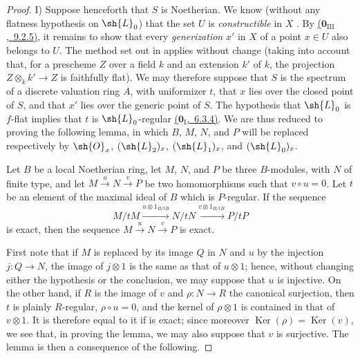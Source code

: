 \begin{proof}
\medskip
I) Suppose henceforth that $S$ is Noetherian.
We know (without any flatness hypothesis on $\sh{L}_0$) that the set $U$ is \emph{constructible} in $X$ .
By \hyperref[0.9.2.5]{($\mathbf{0}_{\mathrm{III}}$,~9.2.5)}, it remains to show that every \emph{generization} $x'$ in $X$ of a point $x\in U$ also belongs to $U$.
The method set out in  applies without change (taking into account that, for a prescheme $Z$ over a field $k$ and an extension $k'$ of $k$, the projection $Z\otimes_k k'\to Z$ is faithfully flat).
We may therefore suppose that $S$ is the spectrum of a discrete valuation ring $A$, with uniformizer $t$, that $x$ lies over the closed point of $S$, and that $x'$ lies over the generic point of $S$.
The hypothesis that $\sh{L}_0$ is $f$-flat implies that $t$ is $\sh{L}_0$-regular \hyperref[0.6.3.4]{($\mathbf{0}_{\mathrm{I}}$,~6.3.4)}.
We are thus reduced to proving the following lemma, in which $B$, $M$, $N$, and $P$ will be replaced respectively by $\sh{O}_x$, $(\sh{L}_2)_x$, $(\sh{L}_1)_x$, and $(\sh{L}_0)_x$.

\begin{lemma}[12.3.3.1]
\label{IV.12.3.3.1}
Let $B$ be a local Noetherian ring, let $M$, $N$, and $P$ be three $B$-modules, with $N$ of finite type, and let
$M\xrightarrow{u}N\xrightarrow{v}P$ be two homomorphisms such that $v\circ u=0$.
Let $t$ be an element of the maximal ideal of $B$ which is $P$-regular.
If the sequence
\begin{equation}
\tag{12.3.3.2}
\label{IV.12.3.3.2}
M/tM \xrightarrow{u\otimes 1_{B/tB}} N/tN \xrightarrow{v\otimes 1_{B/tB}} P/tP
\end{equation}
is exact, then the sequence $M\xrightarrow{u}N\xrightarrow{v}P$ is exact.
\end{lemma}

First note that if $M$ is replaced by its image $Q$ in $N$ and $u$ by the injection $j:Q\to N$, the image of $j\otimes 1$ is the same as that of $u\otimes 1$; hence, without changing either the hypothesis or the conclusion, we may suppose that $u$ is injective.
On the other hand, if $R$ is the image of $v$ and $\rho:N\to R$ the canonical surjection, then $t$ is plainly $R$-regular, $\rho\circ u=0$, and the kernel of $\rho\otimes 1$ is contained in that of $v\otimes 1$.
It is therefore equal to it if  is exact; since moreover $\operatorname{Ker}(\rho)=\operatorname{Ker}(v)$,
we see that, in proving the lemma, we may also suppose that $v$ is surjective.
The lemma is then a consequence of the following.


\end{proof}
